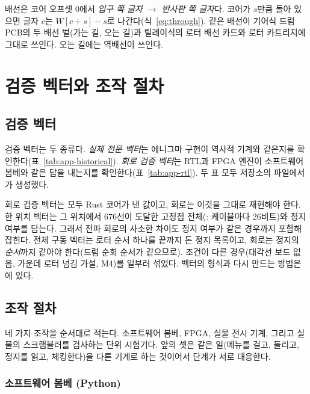 배선은 코어 오프셋 0에서 \emph{입구 쪽 글자 $\to$ 반사판 쪽 글자}다. 코어가 $s$만큼 돌아 있으면 글자 $c$는
$W[c+s]-s$로 나간다(식~\ref{eq:through}). 같은 배선이 기어식 드럼 PCB의 두 배선 벌(가는 길, 오는 길)과 릴레이식의
로터 배선 카드와 로터 카트리지에 그대로 쓰인다. 오는 길에는 역배선이 쓰인다.



\chapter{검증 벡터와 조작 절차}\label{app:vectors}

\section{검증 벡터}\label{sec:app-vectors}

검증 벡터는 두 종류다. \emph{실제 전문 벡터}는 에니그마 구현이 역사적 기계와 같은지를 확인한다(표~\ref{tab:app-historical}).
\emph{회로 검증 벡터}는 RTL과 FPGA 엔진이 소프트웨어 봄베와 같은 답을 내는지를 확인한다(표~\ref{tab:app-rtl}).
두 표 모두 저장소의 파일에서 가 생성했다.

회로 검증 벡터는 모두 Rust 코어가 낸 값이고, 회로는 이것을 그대로 재현해야 한다. 한 위치 벡터는 그 위치에서 676선이
도달한 고정점 전체(: 케이블마다 26비트)와 정지 여부를 담는다. 그래서 전파 회로의 사소한 차이도 정지 여부가
같은 경우까지 포함해 잡힌다. 전체 구동 벡터는 로터 순서 하나를 끝까지 돈 정지 목록이고, 회로는 정지의 \emph{순서}까지
같아야 한다(드럼 순회 순서가 같으므로). 조건이 다른 경우(대각선 보드 없음, 가운데 로터 넘김 가설, M4)를 일부러 섞었다.
벡터의 형식과 다시 만드는 방법은 에 있다.



\section{조작 절차}\label{sec:app-procedure}

네 가지 조작을 순서대로 적는다. 소프트웨어 봄베, FPGA, 실물 전시 기계, 그리고 실물의 스크램블러를 검사하는 단위
시험기다. 앞의 셋은 같은 일(메뉴를 걸고, 돌리고, 정지를 읽고, 체킹한다)을 다른 기계로 하는 것이어서 단계가
서로 대응한다.

\subsection{소프트웨어 봄베 (Python)}

